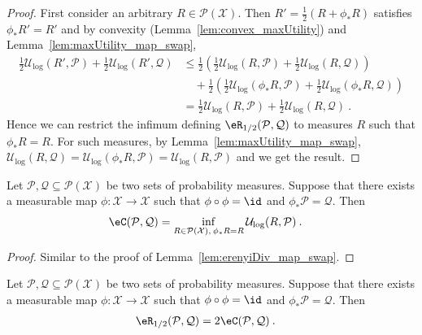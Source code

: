 \begin{proof}\leanok
First consider an arbitrary $R \in \mathcal{P}(\mathcal{X})$.
Then $R' = \frac{1}{2}(R + \phi_* R)$ satisfies $\phi_* R' = R'$ and by convexity (Lemma~\ref{lem:convex_maxUtility}) and Lemma~\ref{lem:maxUtility_map_swap},
\begin{align*}
  \frac{1}{2} \mathcal{U}_{\log}(R', \mathcal{P}) + \frac{1}{2} \mathcal{U}_{\log}(R', \mathcal{Q})
  &\le \frac{1}{2} \left( \frac{1}{2} \mathcal{U}_{\log}(R, \mathcal{P}) + \frac{1}{2} \mathcal{U}_{\log}(R, \mathcal{Q}) \right)
  \\
  &\quad + \frac{1}{2} \left( \frac{1}{2} \mathcal{U}_{\log}(\phi_* R, \mathcal{P}) + \frac{1}{2} \mathcal{U}_{\log}(\phi_* R, \mathcal{Q}) \right)
  \\
  &= \frac{1}{2} \mathcal{U}_{\log}(R, \mathcal{P}) + \frac{1}{2} \mathcal{U}_{\log}(R, \mathcal{Q})
  \: .
\end{align*}
Hence we can restrict the infimum defining $\eR_{1/2}(\mathcal{P}, \mathcal{Q})$ to measures $R$ such that $\phi_* R = R$.
For such measures, by Lemma~\ref{lem:maxUtility_map_swap}, $\mathcal{U}_{\log}(R, \mathcal{Q}) = \mathcal{U}_{\log}(\phi_* R, \mathcal{P}) = \mathcal{U}_{\log}(R, \mathcal{P})$ and we get the result.
\end{proof}


\begin{lemma}\label{lem:echernoffDiv_map_swap}
  \leanok
Let $\mathcal{P},\mathcal{Q} \subseteq \mathcal{P}(\mathcal{X})$ be two sets of probability measures.
Suppose that there exists a measurable map $\phi : \mathcal{X} \to \mathcal{X}$ such that $\phi \circ \phi = \id$ and $\phi_* \mathcal{P} = \mathcal{Q}$.
Then
\begin{align*}
  \eC(\mathcal{P}, \mathcal{Q})
  &= \inf_{R \in \mathcal{P}(\mathcal{X}), \: \phi_* R = R} \mathcal{U}_{\log}(R, \mathcal{P})
  \: .
\end{align*}
\end{lemma}

\begin{proof}\leanok
Similar to the proof of Lemma~\ref{lem:erenyiDiv_map_swap}.
\end{proof}


\begin{lemma}\label{lem:erenyiDiv_eq_two_mul_echernoffDiv}
  \leanok
Let $\mathcal{P},\mathcal{Q} \subseteq \mathcal{P}(\mathcal{X})$ be two sets of probability measures.
Suppose that there exists a measurable map $\phi : \mathcal{X} \to \mathcal{X}$ such that $\phi \circ \phi = \id$ and $\phi_* \mathcal{P} = \mathcal{Q}$.
Then
\begin{align*}
  \eR_{1/2}(\mathcal{P}, \mathcal{Q})
  &= 2 \eC(\mathcal{P}, \mathcal{Q})
  \: .
\end{align*}
\end{lemma}

